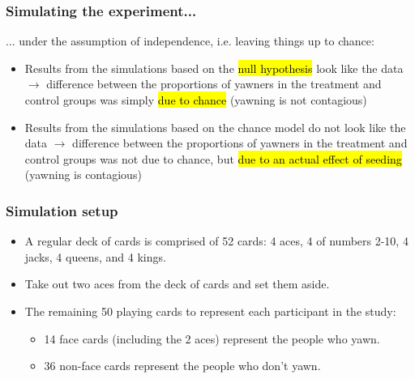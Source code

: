 \documentclass[slidestop,compress,mathserif,12pt,t,professionalfonts,xcolor=table]{beamer}
\begin{document}
\begin{frame}
\frametitle{Simulating the experiment...}

... under the assumption of independence, i.e. leaving things up to chance: \\

\pause

\begin{itemize}

\item Results from the simulations based on the \hl{null hypothesis} look like the data $\rightarrow$ difference between the proportions of yawners in the treatment and control groups was simply \hl{due to chance} (yawning is not contagious) \\

\pause

\item Results from the simulations based on the chance model do not look like the data $\rightarrow$ difference between the proportions of yawners in the treatment and control groups was not due to chance, but \hl{due to an actual effect of seeding} (yawning is contagious)

\end{itemize}

\end{frame}


\begin{frame}
\frametitle{Simulation setup}

\begin{itemize}

\item A regular deck of cards is comprised of 52 cards: 4 aces, 4 of numbers 2-10, 4 jacks, 4 queens, and 4 kings.

\item Take out two aces from the deck of cards and set them aside.

\item The remaining 50 playing cards to represent each participant in the study:
\begin{itemize}
\item 14 face cards (including the 2 aces) represent the people who yawn.
\item 36 non-face cards represent the people who don't yawn.
\end{itemize}

\end{itemize}

\end{frame}
\end{document}
